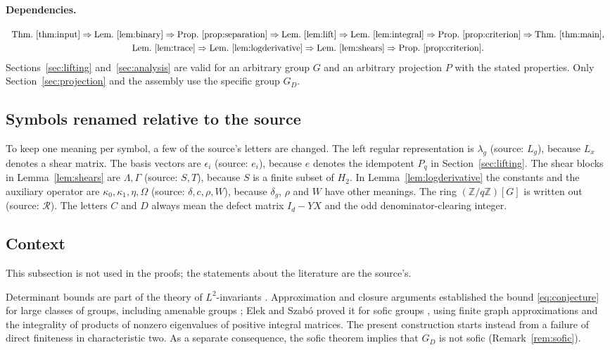 \documentclass[11pt]{article}
\theoremstyle{remark}
\numberwithin{equation}{section}
\newcommand{\Z}{\mathbb Z}
\begin{document}
\paragraph{Dependencies.}
\[
\begin{array}{c}
\text{Thm.~\ref{thm:input}}\Rightarrow\text{Lem.~\ref{lem:binary}}\Rightarrow\text{Prop.~\ref{prop:separation}}
\Rightarrow\text{Lem.~\ref{lem:lift}}\Rightarrow\text{Lem.~\ref{lem:integral}}\Rightarrow\text{Prop.~\ref{prop:criterion}}\Rightarrow\text{Thm.~\ref{thm:main}},\\[3pt]
\text{Lem.~\ref{lem:trace}}\Rightarrow\text{Lem.~\ref{lem:logderivative}}\Rightarrow\text{Lem.~\ref{lem:shears}}\Rightarrow\text{Prop.~\ref{prop:criterion}} .
\end{array}
\]
Sections~\ref{sec:lifting} and~\ref{sec:analysis} are valid for an arbitrary group $G$ and an arbitrary projection $P$ with the stated properties. Only Section~\ref{sec:projection} and the assembly use the specific group $G_D$.

\subsection{Symbols renamed relative to the source}

To keep one meaning per symbol, a few of the source's letters are changed. The left regular representation is $\lambda_g$ (source: $L_g$), because $L_x$ denotes a shear matrix. The basis vectors are $\epsilon_i$ (source: $e_i$), because $e$ denotes the idempotent $P_q$ in Section~\ref{sec:lifting}. The shear blocks in Lemma~\ref{lem:shears} are $\Lambda,\Gamma$ (source: $S,T$), because $S$ is a finite subset of $H_2$. In Lemma~\ref{lem:logderivative} the constants and the auxiliary operator are $\kappa_0,\kappa_1,\eta,\Omega$ (source: $\delta,c,\rho,W$), because $\delta_g$, $\rho$ and $W$ have other meanings. The ring $(\Z/q\Z)[G]$ is written out (source: $\mathcal R$). The letters $C$ and $D$ always mean the defect matrix $I_d-YX$ and the odd denominator-clearing integer.

\subsection{Context}

This subsection is not used in the proofs; the statements about the literature are the source's.

Determinant bounds are part of the theory of $L^2$-invariants \cite{Luck2002}. Approximation and closure arguments established the bound \eqref{eq:conjecture} for large classes of groups, including amenable groups \cite[Theorem 1.21, with its erratum]{Schick2001}; Elek and Szab\'o proved it for sofic groups \cite[Theorem 5]{ElekSzabo2005}, using finite graph approximations and the integrality of products of nonzero eigenvalues of positive integral matrices. The present construction starts instead from a failure of direct finiteness in characteristic two. As a separate consequence, the sofic theorem implies that $G_D$ is not sofic (Remark~\ref{rem:sofic}).
\end{document}
